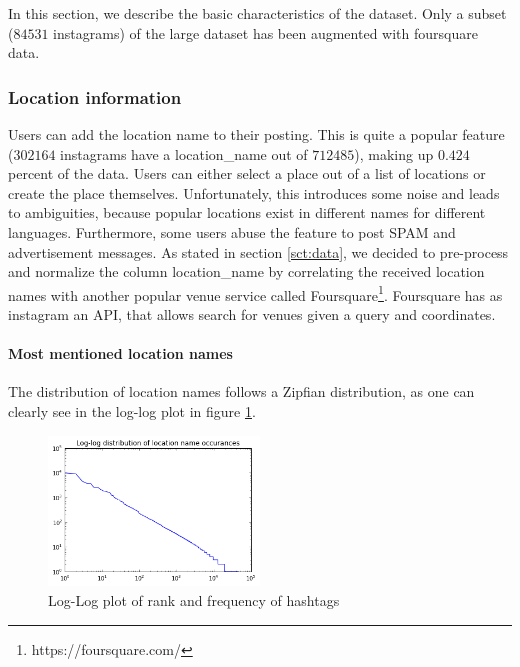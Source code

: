 In this section, we describe the basic characteristics of the dataset. Only a subset ($84531$ instagrams) of the large dataset has been augmented with foursquare data.

\subsubsection{Location information}

Users can add the location name to their posting. This is quite a popular feature ($302164$ instagrams have a location\_name out of $712485$), making up $0.424$ percent of the data. Users can either select a place out of a list of locations or create the place themselves. Unfortunately, this introduces some noise and leads to ambiguities, because popular locations exist in different names for different languages. Furthermore, some users abuse the feature to post SPAM and advertisement messages. As stated in section \ref{sct:data}, we decided to pre-process and normalize the column location\_name by correlating the received location names with another popular venue service called Foursquare\footnote{https://foursquare.com/}. Foursquare has as instagram an API, that allows search for venues given a query and coordinates.

\paragraph{Most mentioned location names}

The distribution of location names follows a Zipfian distribution, as one can clearly see in the log-log plot in figure \ref{fig:location_name_log_log}.

\begin{figure}[h!]
  \centering
    \includegraphics[width=0.5\textwidth]{images/location_name_distribution_log_log}
  \caption{Log-Log plot of rank and frequency of hashtags}
  \label{fig:location_name_log_log}
\end{figure}

